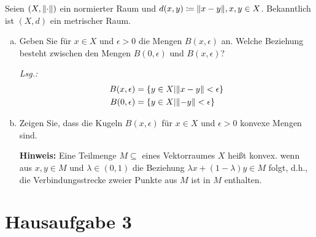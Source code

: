 \documentclass{article}
\begin{document}
Seien $(X, \norm{\cdot})$ ein normierter Raum und
$d(x, y) \coloneqq \norm{x - y}, x, y \in X$.
Bekanntlich ist $(X, d)$ ein metrischer Raum.
\begin{enumerate}[a)]
\item Geben Sie für $x \in X$ und $\epsilon > 0$ die Mengen $B(x, \epsilon)$ an.
  Welche Beziehung besteht zwischen den Mengen $B(0, \epsilon)$ und
  $B(x, \epsilon)$?

  \textit{Lsg.:}
  \begin{align*}
    B(x, \epsilon) &= \qty{ y \in X \middle| \norm{x - y} < \epsilon} \\
    B(0, \epsilon) &= \qty{ y \in X \middle| \norm{-y} < \epsilon}
  \end{align*}
  
\item Zeigen Sie, dass die Kugeln $B(x, \epsilon)$ für $x \in X$ und
  $\epsilon > 0$ konvexe Mengen sind.

  \textbf{Hinweis:} Eine Teilmenge $M \subseteq$ eines Vektorraumes $X$ heißt
  konvex. wenn aus $x, y \in M$ und $\lambda \in (0, 1)$ die Beziehung
  $\lambda x + (1 - \lambda)y \in M$ folgt, d.h., die Verbindungsstrecke
  zweier Punkte aus $M$ ist in $M$ enthalten.
\end{enumerate}

\newpage
\section*{Hausaufgabe 3}
\end{document}
